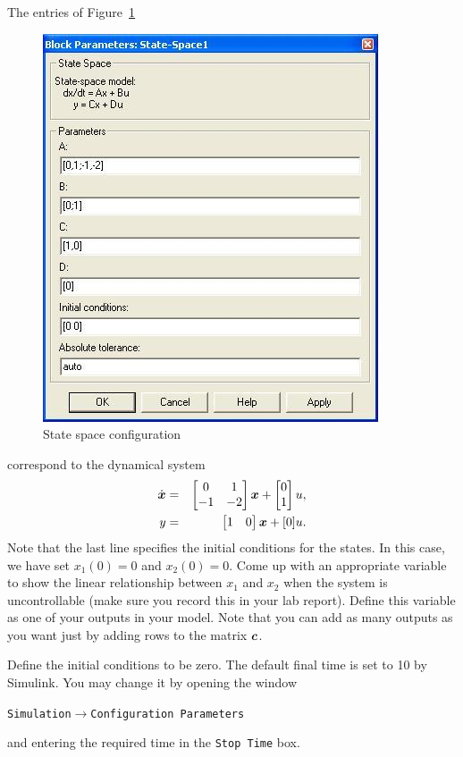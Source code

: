 \begin{enumerate}
The entries of Figure~\ref{fig:stateConfiguration}
\begin{figure}[htbp]
\centering
\includegraphics[width=0.6\hsize]{pix/controlandobserveentries.jpg}
\caption{State space configuration}\label{fig:stateConfiguration}
\end{figure}%
correspond to the dynamical system
\begin{eqnarray*}
\dot{\boldsymbol{x}}&=&\begin{bmatrix}0&1\\-1&-2\end{bmatrix}\boldsymbol{x}
+\begin{bmatrix}0\\1\end{bmatrix}u,\\
y&=&\begin{bmatrix}1&0\end{bmatrix}\boldsymbol{x}+[0]u.
\end{eqnarray*}
Note that the last line specifies the initial conditions for the states.  In
this case, we have set $x_{1}(0)=0$ and $x_{2}(0)=0$\@.  Come up with an
appropriate variable to show the linear relationship between $x_{1}$ and
$x_{2}$ when the system is uncontrollable (make sure you record this in your
lab report).  Define this variable as one of your outputs in your model.
Note that you can add as many outputs as you want just by adding rows to the
matrix $\boldsymbol{c}$\@.

Define the initial conditions to be zero.  The default final time is set to
10 by \textsf{Simulink}.  You may change it by opening the window
\begin{center}
\verb|Simulation|$\rightarrow$\verb|Configuration Parameters|
\end{center}
and entering the required time in the \verb|Stop Time| box.


\end{enumerate}
